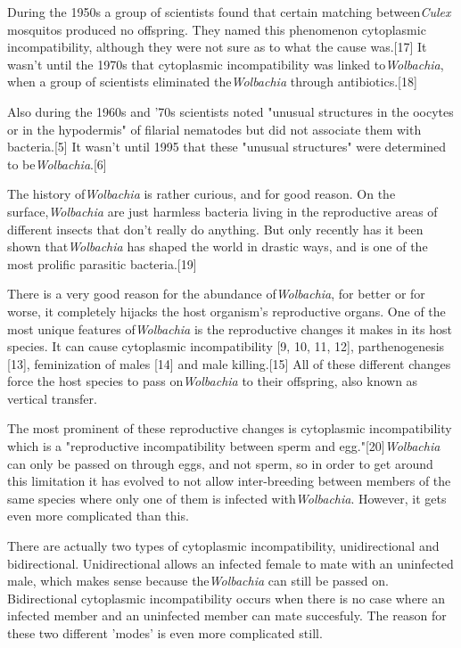 \documentclass[twocolumn]{article}
\begin{document}
During the 1950s a group of scientists found that certain matching between\textit{Culex} mosquitos produced no offspring. They named this phenomenon cytoplasmic incompatibility, although they were not sure as to what the cause was.[17] It wasn't until the 1970s that cytoplasmic incompatibility was linked to\textit{Wolbachia}, when a group of scientists eliminated the\textit{Wolbachia} through antibiotics.[18]

Also during the 1960s and '70s scientists noted "unusual structures in the oocytes or in the hypodermis" of filarial nematodes but did not associate them with bacteria.[5] It wasn't until 1995 that these "unusual structures" were determined to be\textit{Wolbachia}.[6]

The history of\textit{Wolbachia} is rather curious, and for good reason. On the surface,\textit{Wolbachia} are just harmless bacteria living in the reproductive areas of different insects that don't really do anything. But only recently has it been shown that\textit{Wolbachia} has shaped the world in drastic ways, and is one of the most prolific parasitic bacteria.[19]

There is a very good reason for the abundance of\textit{Wolbachia}, for better or for worse, it completely hijacks the host organism's reproductive organs. One of the most unique features of\textit{Wolbachia} is the reproductive changes it makes in its host species. It can cause cytoplasmic incompatibility [9, 10, 11, 12], parthenogenesis [13], feminization of males [14] and male killing.[15] All of these different changes force the host species to pass on\textit{Wolbachia} to their offspring, also known as vertical transfer.

The most prominent of these reproductive changes is cytoplasmic incompatibility which is a "reproductive incompatibility between sperm and egg."[20]\textit{Wolbachia} can only be passed on through eggs, and not sperm, so in order to get around this limitation it has evolved to not allow inter-breeding between members of the same species where only one of them is infected with\textit{Wolbachia}. However, it gets even more complicated than this.

There are actually two types of cytoplasmic incompatibility, unidirectional and bidirectional. Unidirectional allows an infected female to mate with an uninfected male, which makes sense because the\textit{Wolbachia} can still be passed on. Bidirectional cytoplasmic incompatibility occurs when there is no case where an infected member and an uninfected member can mate succesfuly. The reason for these two different 'modes' is even more complicated still.
\end{document}
